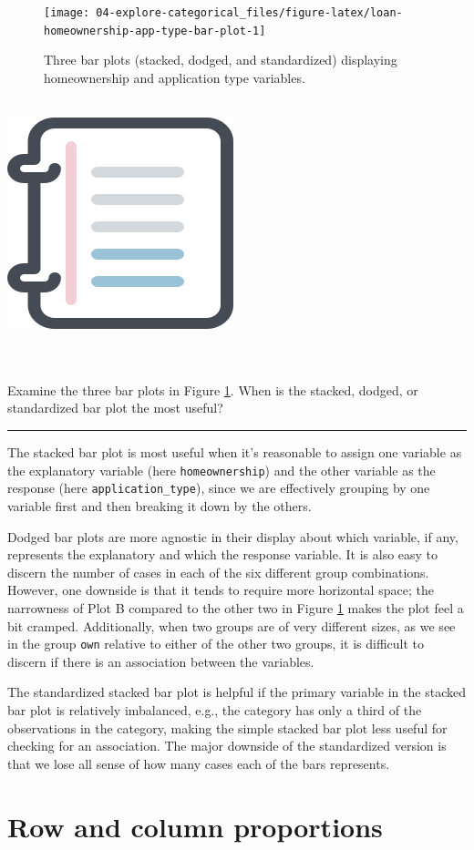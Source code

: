 \documentclass[
  10pt,
  openany]{book}
\newenvironment{mdframedwithfootGPWE}
{   
    \savenotes
    \begin{mdframed}[%
    topline=true, bottomline=true, linecolor=oiB, linewidth=0.5pt,
    rightline=false, leftline=false,
    backgroundcolor=oiLGray]
    \renewcommand{\thempfootnote}{\arabic{footnote}}
    }
{
    \end{mdframed}
    \spewnotes
}
\newenvironment{workedexample}{
    \let\oldrule\rule
    \renewcommand{\rule}[2]{\vspace{-2mm}\oldrule{##1}{##2}\vspace{-2mm}}
\vspace{4mm}
\begin{mdframedwithfootGPWE}
\begin{minipage}[t]{0.10\textwidth}
{$\:$ \\ \setkeys{Gin}{width=2.5em,keepaspectratio}\includegraphics{images/_icons/worked-example.png}}
\end{minipage}
\hfill
\begin{minipage}[t]{0.90\textwidth}
\vspace{-2mm}
\setlength{\parskip}{1em}
\noindent\textbf{\color{oiB}\small\fontfamily{phv}\selectfont{\MakeUppercase{Example}}} $\:$ \\ \\
}{\end{minipage}
\end{mdframedwithfootGPWE}
\vspace{4mm}
}
\begin{document}
\begin{figure}[h]

{\centering \texttt{[image: 04-explore-categorical\_files/figure-latex/loan-homeownership-app-type-bar-plot-1]} 

}

\caption{Three bar plots (stacked, dodged, and standardized) displaying homeownership and application type variables.}\label{fig:loan-homeownership-app-type-bar-plot}
\end{figure}

\begin{workedexample}
Examine the three bar plots in Figure \ref{fig:loan-homeownership-app-type-bar-plot}.
When is the stacked, dodged, or standardized bar plot the most useful?

\begin{center}\rule{0.5\linewidth}{0.5pt}\end{center}

The stacked bar plot is most useful when it's reasonable to assign one variable as the explanatory variable (here \texttt{homeownership}) and the other variable as the response (here \texttt{application\_type}), since we are effectively grouping by one variable first and then breaking it down by the others.

Dodged bar plots are more agnostic in their display about which variable, if any, represents the explanatory and which the response variable.
It is also easy to discern the number of cases in each of the six different group combinations.
However, one downside is that it tends to require more horizontal space; the narrowness of Plot B compared to the other two in Figure \ref{fig:loan-homeownership-app-type-bar-plot} makes the plot feel a bit cramped.
Additionally, when two groups are of very different sizes, as we see in the group \texttt{own} relative to either of the other two groups, it is difficult to discern if there is an association between the variables.

The standardized stacked bar plot is helpful if the primary variable in the stacked bar plot is relatively imbalanced, e.g., the category has only a third of the observations in the category, making the simple stacked bar plot less useful for checking for an association.
The major downside of the standardized version is that we lose all sense of how many cases each of the bars represents.

\end{workedexample}

\hypertarget{row-and-column-proportions}{%
\section{Row and column proportions}\label{row-and-column-proportions}}
\end{document}
